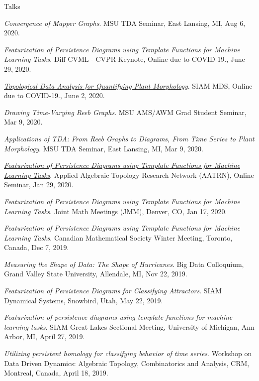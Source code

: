 \documentclass{resume} %
\begin{document}
\begin{rSection}{Talks}
\begin{etaremune}
\item\emph{Convergence of Mapper Graphs}. MSU TDA Seminar, East Lansing, MI, Aug 6, 2020. 

\item\emph{Featurization of Persistence Diagrams using Template Functions for Machine Learning Tasks}. Diff CVML - CVPR Keynote, Online due to COVID-19., June 29, 2020. 

\item\emph{\href{https://youtu.be/2mscXkz_o4A}{Topological Data Analysis for Quantifying Plant Morphology}}. SIAM MDS, Online due to COVID-19., June 2, 2020. 

\item\emph{Drawing Time-Varying Reeb Graphs}. MSU AMS/AWM Grad Student Seminar, Mar 9, 2020. 

\item\emph{Applications of TDA: From Reeb Graphs to Diagrams, From Time Series to Plant Morphology}. MSU TDA Seminar, East Lansing, MI, Mar 9, 2020. 

\item\emph{\href{https://youtu.be/Moh9lF4UVs4}{Featurization of Persistence Diagrams using Template Functions for Machine Learning Tasks}}. Applied Algebraic Topology Research Network (AATRN), Online Seminar, Jan 29, 2020. 

\item\emph{Featurization of Persistence Diagrams using Template Functions for Machine Learning Tasks}. Joint Math Meetings (JMM), Denver, CO, Jan 17, 2020. 

\item\emph{Featurization of Persistence Diagrams using Template Functions for Machine Learning Tasks}. Canadian Mathematical Society Winter Meeting, Toronto, Canada, Dec 7, 2019. 

\item\emph{Measuring the Shape of Data: The Shape of Hurricanes}. Big Data Colloquium, Grand Valley State University, Allendale, MI, Nov 22, 2019. 

\item\emph{Featurization of Persistence Diagrams for Classifying Attractors}. SIAM Dynamical Systems, Snowbird, Utah, May 22, 2019. 

\item\emph{Featurization of persistence diagrams using template functions for machine learning tasks}. SIAM Great Lakes Sectional Meeting, University of Michigan, Ann Arbor, MI, April 27, 2019. 

\item\emph{Utilizing persistent homology for classifying behavior of time series}. Workshop on Data Driven Dynamics: Algebraic Topology, Combinatorics and Analysis, CRM, Montreal, Canada, April 18, 2019. 


\end{etaremune}
\end{rSection}
\end{document}
